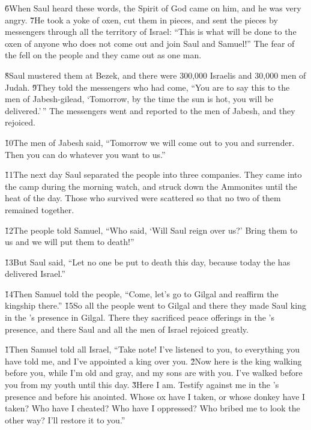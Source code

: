 \v{6}When Saul heard these words, the Spirit of God came on him, and he was very angry. \v{7}He took a yoke of oxen, cut them in pieces, and sent the pieces by messengers through all the territory of Israel: ``This is what will be done to the oxen of anyone who does not come out and join Saul and Samuel!'' The fear of the  fell on the people and they came out as one man.

\v{8}Saul mustered them at Bezek, and there were 300,000 Israelis and 30,000 men of Judah. \v{9}They told the messengers who had come, ``You are to say this to the men of Jabesh-gilead, `Tomorrow, by the time the sun is hot, you will be delivered.'\,'' The messengers went and reported to the men of Jabesh, and they rejoiced.

\v{10}The men of Jabesh said, ``Tomorrow we will come out to you and surrender. Then you can do whatever you want to us.''

\v{11}The next day Saul separated the people into three companies. They came into the camp during the morning watch, and struck down the Ammonites until the heat of the day. Those who survived were scattered so that no two of them remained together.

\v{12}The people told Samuel, ``Who said, `Will Saul reign over us?' Bring them to us and we will put them to death!''

\v{13}But Saul said, ``Let no one be put to death this day, because today the  has delivered Israel.''

\v{14}Then Samuel told the people, ``Come, let's go to Gilgal and reaffirm the kingship there.'' \v{15}So all the people went to Gilgal and there they made Saul king in the 's presence in Gilgal. There they sacrificed peace offerings in the 's presence, and there Saul and all the men of Israel rejoiced greatly.

\v{1}Then Samuel told all Israel, ``Take note! I've listened to you, to everything you have told me, and I've appointed a king over you. \v{2}Now here is the king walking before you, while I'm old and gray, and my sons are with you. I've walked before you from my youth until this day. \v{3}Here I am. Testify against me in the 's presence and before his anointed. Whose ox have I taken, or whose donkey have I taken? Who have I cheated? Who have I oppressed? Who bribed me to look the other way? I'll restore it to you.''

